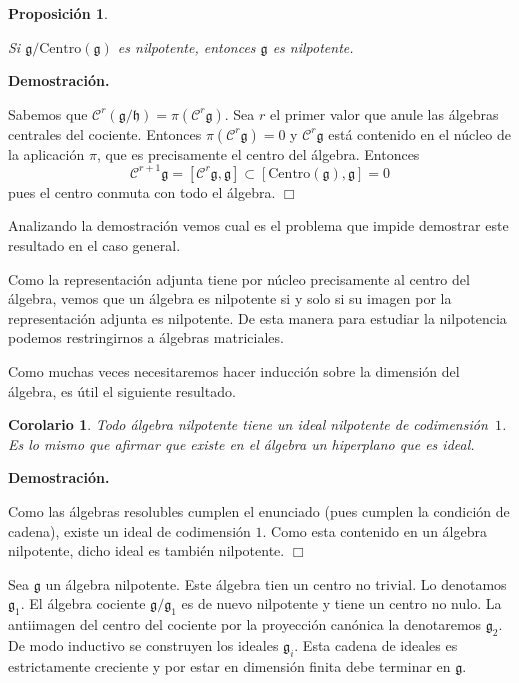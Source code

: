 \documentclass[a4paper,draft,12pt]{scrartcl}
\newtheorem{propo}[teo]{Proposición}%
\newtheorem{cor}[teo]{Corolario}%
\newcommand{\dem}{\noindent \textbf{Demostración. }\vspace{0.3 cm}}%
\newcommand{\g}{\mathfrak{g}}%
\newcommand{\fin}{ $\Box $ \vspace{0.4 cm}}
\newcommand{\central}{\mathcal{C}}%
\begin{document}
\begin{propo}\label{propo:centronilpotente}

Si $\g/\mathrm{Centro}(\g)$ es nilpotente, entonces $\g$ es nilpotente.

\end{propo}

\dem

Sabemos que $\central^r(\g/\mathfrak{h})= \pi (\central^r \g)$.  Sea $r$ el primer valor que anule las álgebras centrales del cociente.  Entonces $ \pi (\central^r \g)=0$ y $\central^r\g$ está contenido en el núcleo de la aplicación $\pi$, que es precisamente el centro del álgebra.  Entonces
$$
\central^{r+1}\g = [\central^r \g, \g] \subset [\mathrm{Centro}(\g),\g]=0
$$
pues el centro conmuta con todo el álgebra.  \fin


Analizando la demostración vemos cual es el problema que impide demostrar este resultado en el caso general.

Como la representación adjunta tiene por núcleo precisamente al centro del álgebra, vemos que un álgebra es nilpotente si y solo si su imagen por la representación adjunta es nilpotente.  De esta manera para estudiar la nilpotencia podemos restringirnos a álgebras matriciales.

Como muchas veces necesitaremos hacer inducción sobre la dimensión del álgebra, es útil el siguiente resultado.

\begin{cor}

Todo álgebra nilpotente tiene un ideal nilpotente de codimensión~$1$.  Es lo mismo que afirmar que existe en el álgebra un hiperplano que es ideal.

\end{cor}


\dem

 Como las álgebras resolubles cumplen el enunciado (pues cumplen la condición de cadena), existe un ideal de codimensión $1$.  Como esta contenido en un álgebra nilpotente, dicho ideal es también nilpotente.  \fin

Sea $\g$ un álgebra nilpotente.  Este álgebra tien un centro no trivial.  Lo denotamos $\g_1$.  El álgebra cociente $\g/ \g_1$ es de nuevo nilpotente y tiene un centro no nulo.  La antiimagen del centro del cociente por la proyección canónica la denotaremos $\g_2$.  De modo inductivo se construyen los ideales $\g_i$. Esta cadena de ideales es estrictamente creciente y por estar en dimensión finita debe terminar en $\g$.
\end{document}

